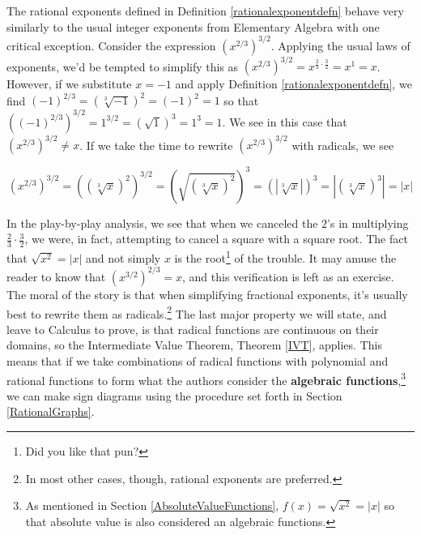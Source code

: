 \smallskip

The rational exponents defined in Definition \ref{rationalexponentdefn} behave very similarly to the usual integer exponents from Elementary Algebra with one critical exception.  Consider the expression $\left(x^{2/3}\right)^{3/2}$.  Applying the usual laws of exponents, we'd be tempted to simplify this as $\left(x^{2/3}\right)^{3/2} = x^{\frac{2}{3} \cdot \frac{3}{2}} = x^{1} = x$.  However, if we substitute $x=-1$ and apply Definition \ref{rationalexponentdefn}, we find $(-1)^{2/3} = \left(\sqrt[3]{-1}\right)^2 = (-1)^2 = 1$ so that $\left((-1)^{2/3}\right)^{3/2} = 1^{3/2} = \left(\sqrt{1}\right)^3 = 1^3 = 1$.  We see in this case that $\left(x^{2/3}\right)^{3/2} \neq x$.  If we take the time to rewrite $\left(x^{2/3}\right)^{3/2}$ with radicals, we see 

\[ \left(x^{2/3}\right)^{3/2} = \left(\left(\sqrt[3]{x}\right)^2\right)^{3/2} =  \left(\sqrt{\left(\sqrt[3]{x}\right)^2}\right)^3 =\left(\left|\sqrt[3]{x}\right|\right)^3 = \left| \left(\sqrt[3]{x}\right)^3  \right| = |x|\]

In the play-by-play analysis, we see that when we canceled the $2$'s in multiplying $\frac{2}{3} \cdot \frac{3}{2}$, we were, in fact, attempting to cancel a square with a square root.  The fact that $\sqrt{x^2} = |x|$ and not simply $x$ is the root\footnote{Did you like that pun?} of the trouble.  It may amuse the reader to know that  $\left(x^{3/2}\right)^{2/3} = x$, and this verification is left as an exercise.  The moral of the story is that when simplifying fractional exponents, it's usually best to rewrite them as radicals.\footnote{In most other cases, though, rational exponents are preferred.}   The last major property we will state, and leave to Calculus to prove, is that radical functions are continuous on their domains, so the Intermediate Value Theorem, Theorem \ref{IVT}, applies.  This means that if we take combinations of radical functions with polynomial and rational functions to form what the authors consider  the \textbf{algebraic functions},\footnote{As mentioned in Section \ref{AbsoluteValueFunctions}, $f(x) = \sqrt{x^2}=|x|$ so that absolute value is also considered an algebraic functions.} we can make sign diagrams using the procedure set forth in Section \ref{RationalGraphs}.  

\medskip

\label{algebraicsigndiagram}

